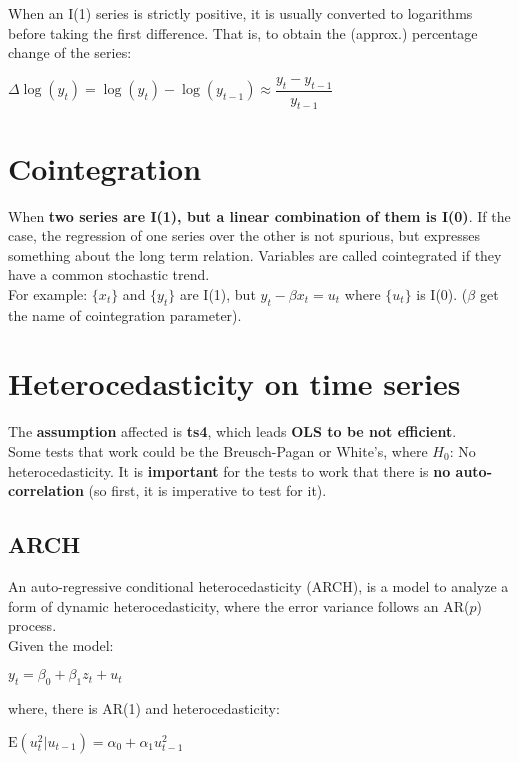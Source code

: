 \documentclass[10pt, a4paper, landscape]{extarticle}
\newcommand{\E}{\mathrm{E}}
\begin{document}
\begin{multicols}{3}
\begin{multicols}{2}
		\end{multicols}
		When an I(1) series is strictly positive, it is usually converted to logarithms before taking the first difference. That is, to obtain the (approx.) percentage change of the series:
		\begin{center}
			$\Delta \log(y_t) = \log(y_t) - \log(y_{t-1}) \approx \dfrac{y_t - y_{t-1}}{y_{t-1}}$
		\end{center}
\columnbreak
\section*{Cointegration}
	When \textbf{two series are I(1), but a linear combination of them is I(0)}. If the case, the regression of one series over the other is not spurious, but expresses something about the long term relation. Variables are called cointegrated if they have a common stochastic trend. \\
	For example: $\lbrace x_t \rbrace$ and $\lbrace y_t \rbrace$ are I(1), but $y_t - \beta x_t = u_t$ where $\lbrace u_t \rbrace$ is I(0). ($\beta$ get the name of cointegration parameter).

\section*{Heterocedasticity on time series}
	The \textbf{assumption} affected is \textbf{ts4}, which leads \textbf{OLS to be not efficient}. \\ 
	Some tests that work could be the Breusch-Pagan or White's, where $H_0$: No heterocedasticity. It is \textbf{important} for the tests to work that there is \textbf{no auto-correlation} (so first, it is imperative to test for it).
	\subsection*{ARCH}
		An auto-regressive conditional heterocedasticity (ARCH), is a model to analyze a form of dynamic heterocedasticity, where the error variance follows an AR($p$) process. \\
		Given the model:
		\begin{center}
			$y_t = \beta_0 + \beta_1 z_t + u_t$
		\end{center}
		where, there is AR(1) and heterocedasticity:
		\begin{center}
			$\E(u^2_t | u_{t-1}) = \alpha_0 + \alpha_1 u^2_{t-1}$
		\end{center}

\end{multicols}
\end{document}
